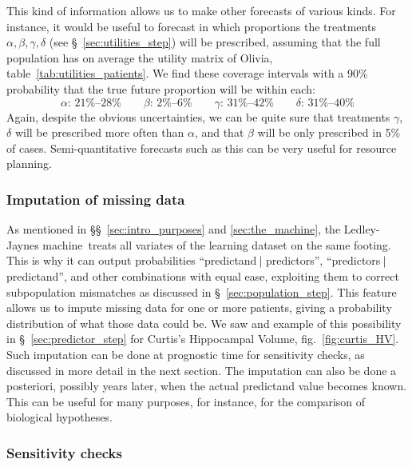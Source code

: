\documentclass[utf8]{FrontiersinHarvard} %
\newcommand*{\sect}{\S}%
\newcommand*{\sects}{\S\S}%
\newcommand*{\fig}{fig.}%
\renewcommand*{\|}[1][]{\nonscript\:#1\vert\nonscript\:\mathopen{}}
\newcommand*{\ljm}{Ledley-Jaynes machine}
\begin{document}
This kind of information allows us to make other forecasts of various kinds. For instance, it would be useful to forecast in which proportions the treatments $\alpha,\beta,\gamma,\delta$ (see \sect~\ref{sec:utilities_step}) will be prescribed, assuming that the full population has on average the utility matrix of Olivia, table~\ref{tab:utilities_patients}. We find these coverage intervals with a 90\% probability that the true future proportion will be within each:
\begin{equation}
  \label{eq:ranges_future_treatments}
  \alpha\text{: 21\%--28\%}\qquad
  \beta\text{: 2\%--6\%}\qquad
  \gamma\text{: 31\%--42\%}\qquad
  \delta\text{: 31\%--40\%}
\end{equation}
Again, despite the obvious uncertainties, we can be quite sure that treatments $\gamma$, $\delta$ will be prescribed more often than $\alpha$, and that $\beta$ will be only prescribed in 5\% of cases. Semi-quantitative forecasts such as this can be very useful for resource planning.

\subsubsection{Imputation of missing data}
\label{sec:missing_data}

As mentioned in \sects~\ref{sec:intro_purposes} and \ref{sec:the_machine}, the \ljm\ treats all variates of the learning dataset on the same footing. This is why it can output probabilities \enquote{predictand$\|$predictors}, \enquote{predictors$\|$predictand}, and other combinations with equal ease, exploiting them to correct subpopulation mismatches as discussed in \sect~\ref{sec:population_step}. This feature allows us to impute missing data for one or more patients, giving a probability distribution of what those data could be. We saw and example of this possibility in \sect~\ref{sec:predictor_step} for Curtis's Hippocampal Volume, \fig~\ref{fig:curtis_HV}. Such imputation can be done at prognostic time for sensitivity checks, as discussed in more detail in the next section. The imputation can also be done a posteriori, possibly years later, when the actual predictand value becomes known. This can be useful for many purposes, for instance, for the comparison of biological hypotheses.


\subsubsection{Sensitivity checks}
\label{sec:sensitivity}
\end{document}
